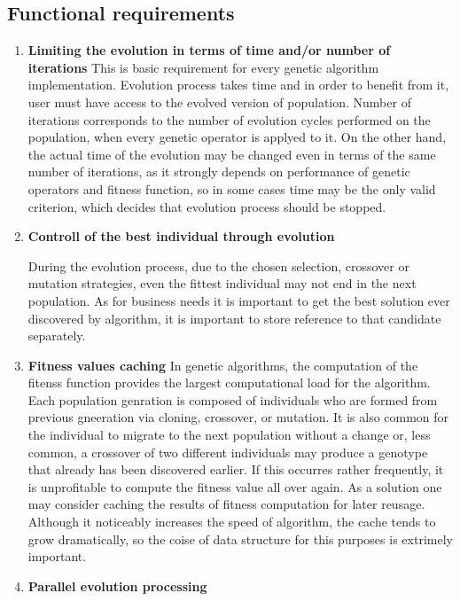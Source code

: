 \subsection{Functional requirements}
\begin{enumerate}
\item \label{freq:stop} \textbf{Limiting the evolution in terms of time and/or number of iterations}
This is basic requirement for every genetic algorithm implementation. Evolution process takes time and in order to benefit from it, user must have access to the evolved version of population. Number of iterations corresponds to the number of evolution cycles performed on the population, when every genetic operator is applyed to it. On the other hand, the actual time of the evolution may be changed even in terms of the same number of iterations, as it strongly depends on performance of genetic operators and fitness function, so in some cases time may be the only valid criterion, which decides that evolution process should be stopped. 
\medbreak

\item \label{freq:best} \textbf{Controll of the best individual through evolution}

During the evolution process, due to the chosen selection, crossover or mutation strategies, even the fittest individual may not end in the next population. As for business needs it is important to get the best solution ever discovered by algorithm, it is important to store reference to that candidate separately.
\medbreak

\item \label{freq:cache} \textbf{Fitness values caching}
In genetic algorithms, the computation of the fitenss function provides the largest computational load for the algorithm. Each population genration is composed of individuals who are formed from previous gneeration via cloning, crossover, or mutation. It is also common for the individual to migrate to the next population without a change or, less common, a crossover of two different individuals may produce a genotype that already has been discovered earlier. If this occurres rather frequently, it is unprofitable to compute the fitness value all over again. As a solution one may consider caching the results of fitness computation for later reusage. Although it noticeably increases the speed of algorithm, the cache tends to grow dramatically, so the coise of data structure for this purposes is extrimely important. 
\medbreak

\item \label{freq:par} \textbf{Parallel evolution processing}


\end{enumerate}
